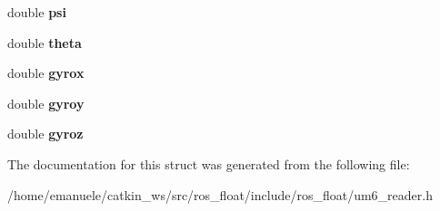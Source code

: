 \begin{DoxyCompactItemize}
double {\bfseries psi}
\item 
\mbox{\label{structUM6__DATA_a2c177fae05469423024e3959b2b8d3f5}} 
double {\bfseries theta}
\item 
\mbox{\label{structUM6__DATA_a789182c4d5cd5ef5e354d3c6948b91e3}} 
double {\bfseries gyrox}
\item 
\mbox{\label{structUM6__DATA_a54092125813f72dc4fdf4c14a7a6ce36}} 
double {\bfseries gyroy}
\item 
\mbox{\label{structUM6__DATA_a66cbd5d8aa21a4c746374a8afac9e5f1}} 
double {\bfseries gyroz}
\end{DoxyCompactItemize}


The documentation for this struct was generated from the following file\+:\begin{DoxyCompactItemize}
\item 
/home/emanuele/catkin\+\_\+ws/src/ros\+\_\+float/include/ros\+\_\+float/um6\+\_\+reader.\+h\end{DoxyCompactItemize}
